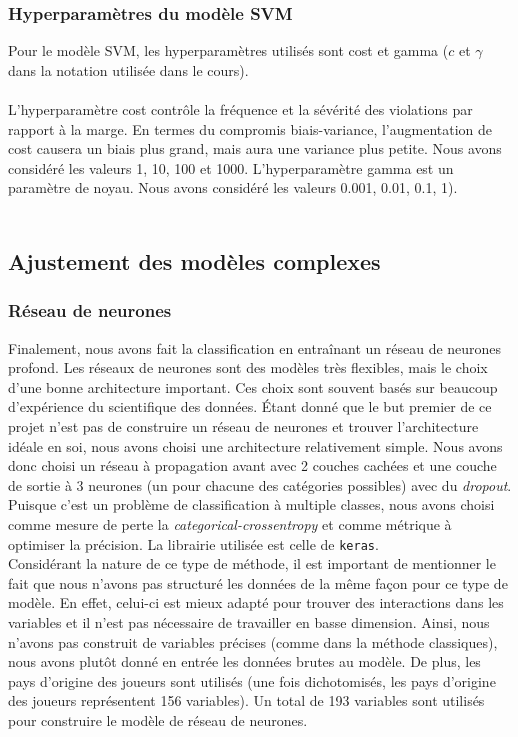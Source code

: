 \subsubsection{Hyperparamètres du modèle SVM}
Pour le modèle SVM, les hyperparamètres utilisés sont cost et gamma ($c$ et $\gamma$ dans la notation utilisée dans le cours).\\ \\ 
L'hyperparamètre cost contrôle la fréquence et la sévérité des violations par rapport à la marge. En termes du compromis biais-variance, l'augmentation de cost causera un biais plus grand, mais aura une variance plus petite. Nous avons considéré les valeurs 1, 10, 100 et 1000. L'hyperparamètre gamma est un paramètre de noyau. Nous avons considéré les valeurs 0.001, 0.01, 0.1, 1).\\ \\ 

\subsection{Ajustement des modèles complexes}

\subsubsection{Réseau de neurones}

Finalement, nous avons fait la classification en entraînant un réseau de neurones profond. Les réseaux de neurones sont des modèles très flexibles, mais le choix d'une bonne architecture important. Ces choix sont souvent basés sur beaucoup d'expérience du scientifique des données. Étant donné que le but premier de ce projet n'est pas de construire un réseau de neurones et trouver l'architecture idéale en soi, nous avons choisi une architecture relativement simple. Nous avons donc choisi un réseau à propagation avant avec 2 couches cachées et une couche de sortie à 3 neurones (un pour chacune des catégories possibles) avec du \textit{dropout}. Puisque c'est un problème de classification à multiple classes, nous avons choisi comme mesure de perte la \textit{categorical-crossentropy} et comme métrique à optimiser la précision. La librairie utilisée est celle de \texttt{keras}.\\

Considérant la nature de ce type de méthode, il est important de mentionner le fait que nous n'avons pas structuré les données de la même façon pour ce type de modèle. En effet, celui-ci est mieux adapté pour trouver des interactions dans les variables et il n'est pas nécessaire de travailler en basse dimension. Ainsi, nous n'avons pas construit de variables précises (comme dans la méthode classiques), nous avons plutôt donné en entrée les données brutes au modèle. De plus, les pays d'origine des joueurs sont utilisés (une fois dichotomisés, les pays d'origine des joueurs représentent 156 variables). Un total de 193 variables sont utilisés pour construire le modèle de réseau de neurones.

